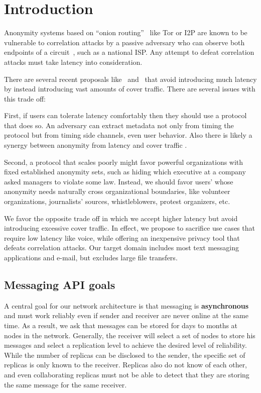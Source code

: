 
\section{Introduction}

Anonymity systems based on ``onion routing''~\cite{SS03} like Tor or
I2P are known to be vulnerable to correlation attacks by a passive
adversary who can observe both endpoints of a
circuit~\cite{timing-fc2004}, such as a national ISP.  Any attempt to
defeat correlation attacks must take latency into consideration.

There are several recent proposals like~\cite{Alpenhorn}
and~\cite{Dissent} that avoid introducing much latency by instead
introducing vast amounts of cover traffic.  There are several issues
with this trade off:  

First, if users can tolerate latency comfortably then they should
use a protocol that does so.  An adversary can extract metadata not
only from timing the protocol but from timing side channels, even
user behavior.  Also there is likely a synergy between anonymity from
latency and cover traffic \cite{??}.

Second, a protocol that scales poorly might favor powerful
organizations with fixed established anonymity sets, such as hiding
which executive at a company asked managers to violate some law.
Instead, we should favor users' whose anonymity needs naturally
cross organizational boundaries, like volunteer organizations,
journalists' sources, whistleblowers, protest organizers, etc.

We favor the opposite trade off in which we accept higher latency but
avoid introducing excessive cover traffic. In effect, we propose to
sacrifice use cases that require low latency like voice, while
offering an inexpensive privacy tool that defeats correlation attacks.
Our target domain includes most text messaging applications and
e-mail, but excludes large file transfers.

\subsection{Messaging API goals} 

A central goal for our network architecture is that messaging is 
{\bf asynchronous} and must work reliably even if sender and receiver
are never online at the same time.  As a result, we ask that messages
can be stored for days to months at nodes in the network.  Generally,
the receiver will select a set of nodes to store his messages and
select a replication level to achieve the desired level of
reliability. While the number of replicas can be disclosed to the
sender, the specific set of replicas is only known to the receiver.
Replicas also do not know of each other, and even collaborating
replicas must not be able to detect that they are storing the same
message for the same receiver.

